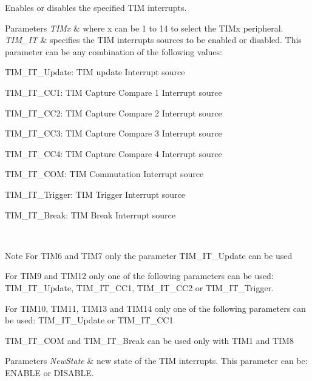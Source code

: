 Enables or disables the specified T\+IM interrupts. 


\begin{DoxyParams}{Parameters}
{\em T\+I\+Mx} & where x can be 1 to 14 to select the T\+I\+Mx peripheral. \\
\hline
{\em T\+I\+M\+\_\+\+IT} & specifies the T\+IM interrupts sources to be enabled or disabled. This parameter can be any combination of the following values\+: \begin{DoxyItemize}
\item T\+I\+M\+\_\+\+I\+T\+\_\+\+Update\+: T\+IM update Interrupt source \item T\+I\+M\+\_\+\+I\+T\+\_\+\+C\+C1\+: T\+IM Capture Compare 1 Interrupt source \item T\+I\+M\+\_\+\+I\+T\+\_\+\+C\+C2\+: T\+IM Capture Compare 2 Interrupt source \item T\+I\+M\+\_\+\+I\+T\+\_\+\+C\+C3\+: T\+IM Capture Compare 3 Interrupt source \item T\+I\+M\+\_\+\+I\+T\+\_\+\+C\+C4\+: T\+IM Capture Compare 4 Interrupt source \item T\+I\+M\+\_\+\+I\+T\+\_\+\+C\+OM\+: T\+IM Commutation Interrupt source \item T\+I\+M\+\_\+\+I\+T\+\_\+\+Trigger\+: T\+IM Trigger Interrupt source \item T\+I\+M\+\_\+\+I\+T\+\_\+\+Break\+: T\+IM Break Interrupt source\end{DoxyItemize}
\\
\hline
\end{DoxyParams}
\begin{DoxyNote}{Note}
For T\+I\+M6 and T\+I\+M7 only the parameter T\+I\+M\+\_\+\+I\+T\+\_\+\+Update can be used 

For T\+I\+M9 and T\+I\+M12 only one of the following parameters can be used\+: T\+I\+M\+\_\+\+I\+T\+\_\+\+Update, T\+I\+M\+\_\+\+I\+T\+\_\+\+C\+C1, T\+I\+M\+\_\+\+I\+T\+\_\+\+C\+C2 or T\+I\+M\+\_\+\+I\+T\+\_\+\+Trigger. 

For T\+I\+M10, T\+I\+M11, T\+I\+M13 and T\+I\+M14 only one of the following parameters can be used\+: T\+I\+M\+\_\+\+I\+T\+\_\+\+Update or T\+I\+M\+\_\+\+I\+T\+\_\+\+C\+C1 

T\+I\+M\+\_\+\+I\+T\+\_\+\+C\+OM and T\+I\+M\+\_\+\+I\+T\+\_\+\+Break can be used only with T\+I\+M1 and T\+I\+M8
\end{DoxyNote}

\begin{DoxyParams}{Parameters}
{\em New\+State} & new state of the T\+IM interrupts. This parameter can be\+: E\+N\+A\+B\+LE or D\+I\+S\+A\+B\+LE. \\
\hline
\end{DoxyParams}

